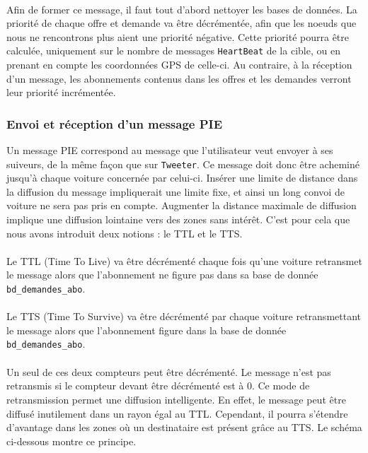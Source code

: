 \paragraph*{}
Afin de former ce message, il faut tout d'abord nettoyer les bases de données. La priorité de chaque offre et demande va être décrémentée, afin que les noeuds que nous ne rencontrons plus aient une priorité négative. Cette priorité pourra être calculée, uniquement sur le nombre de messages \texttt{HeartBeat} de la cible, ou en prenant en compte les coordonnées GPS de celle-ci. Au contraire, à la réception d'un message, les abonnements contenus dans les offres et les demandes verront leur priorité incrémentée.

\subsubsection{Envoi et réception d'un message PIE}
Un message PIE correspond au message que l'utilisateur veut envoyer à ses suiveurs, de la même façon que sur \texttt{Tweeter}. Ce message doit donc être acheminé jusqu'à chaque voiture concernée par celui-ci. Insérer une limite de distance dans la diffusion du message impliquerait une limite fixe, et ainsi un long convoi de voiture ne sera pas pris en compte. Augmenter la distance maximale de diffusion implique une diffusion lointaine vers des zones sans intérêt. C'est pour cela que nous avons introduit deux notions : le TTL et le TTS.

\paragraph*{}
Le TTL (Time To Live) va être décrémenté chaque fois qu'une voiture retransmet le message alors que l'abonnement ne figure pas dans sa base de donnée \texttt{bd\_demandes\_abo}.
\paragraph*{}
Le TTS (Time To Survive) va être décrémenté par chaque voiture retransmettant le message alors que l'abonnement figure dans la base de donnée \texttt{bd\_demandes\_abo}.
\paragraph*{}
Un seul de ces deux compteurs peut être décrémenté. Le message n'est pas retransmis si le compteur devant être décrémenté est à 0. Ce mode de retransmission permet une diffusion intelligente. En effet, le message peut être diffusé inutilement dans un rayon égal au TTL. Cependant, il pourra s'étendre d'avantage dans les zones où un destinataire est présent grâce au TTS. Le schéma ci-dessous montre ce principe.

